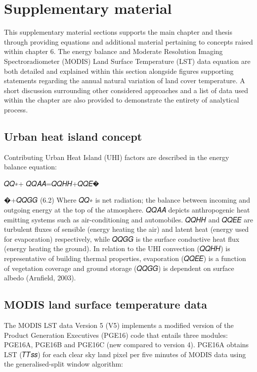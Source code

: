 \documentclass[]{book}
\begin{document}
\section{Supplementary material}\label{supplementary-material-2}

This supplementary material sections supports the main chapter and
thesis through providing equations and additional material pertaining to
concepts raised within chapter 6. The energy balance and Moderate
Resolution Imaging Spectroradiometer (MODIS) Land Surface Temperature
(LST) data equation are both detailed and explained within this section
alongside figures supporting statements regarding the annual natural
variation of land cover temperature. A short discussion surrounding
other considered approaches and a list of data used within the chapter
are also provided to demonstrate the entirety of analytical process.

\subsection{Urban heat island concept}\label{urban-heat-island-concept}

Contributing Urban Heat Island (UHI) factors are described in the energy
balance equation:

𝑄𝑄∗+ 𝑄𝑄𝐴𝐴=𝑄𝑄𝐻𝐻+𝑄𝑄𝐸�

�+𝑄𝑄𝐺𝐺 (6.2) Where 𝑄𝑄∗ is net radiation; the balance between incoming
and outgoing energy at the top of the atmosphere. 𝑄𝑄𝐴𝐴 depicts
anthropogenic heat emitting systems such as air-conditioning and
automobiles. 𝑄𝑄𝐻𝐻 and 𝑄𝑄𝐸𝐸 are turbulent fluxes of sensible (energy
heating the air) and latent heat (energy used for evaporation)
respectively, while 𝑄𝑄𝐺𝐺 is the surface conductive heat flux (energy
heating the ground). In relation to the UHI convection (𝑄𝑄𝐻𝐻) is
representative of building thermal properties, evaporation (𝑄𝑄𝐸𝐸) is a
function of vegetation coverage and ground storage (𝑄𝑄𝐺𝐺) is dependent
on surface albedo (Arnfield, 2003).

\subsection{MODIS land surface temperature
data}\label{modis-land-surface-temperature-data}

The MODIS LST data Version 5 (V5) implements a modified version of the
Product Generation Executives (PGE16) code that entails three modules:
PGE16A, PGE16B and PGE16C (new compared to version 4). PGE16A obtains
LST (𝑇𝑇𝑠𝑠) for each clear sky land pixel per five minutes of MODIS data
using the generalised-split window algorithm:
\end{document}
